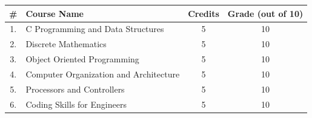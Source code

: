 \documentclass{gradstudentresume}
\begin{document}
\setlength{\tabcolsep}{0.5em} %
{\renewcommand{\arraystretch}{1.2}%
\begin{center}
	\begin{tabular}{ | c | m{7cm} | c | c | } 
	\hline
	\textbf{\#} & \textbf{Course Name} & \textbf{Credits} & \textbf{Grade (out of 10)} \\
	\hline
	1. & C Programming and Data Structures & 5 & 10  \\
	\hline
	2. & Discrete Mathematics & 5 & 10  \\
	\hline
	3. & Object Oriented Programming  & 5 & 10  \\
	\hline
	4. & Computer Organization and Architecture  & 5 & 10  \\
	\hline
	5. & Processors and Controllers & 5 & 10  \\
	\hline
	6. & Coding Skills for Engineers & 5 & 10  \\
	\hline
\end{tabular}
\end{center}


}
\end{document}

